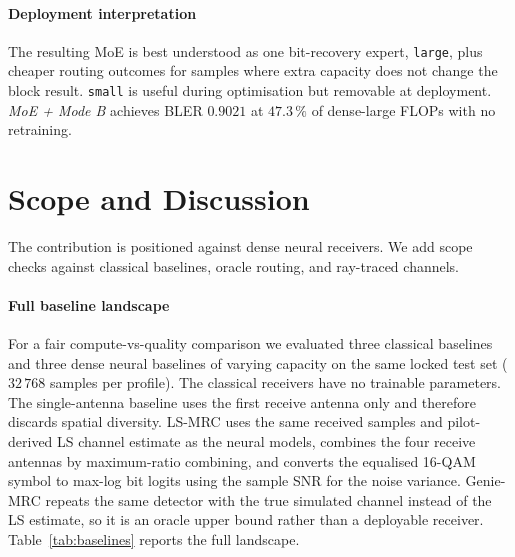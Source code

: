 \paragraph{Deployment interpretation}
The resulting MoE is best understood as one bit-recovery expert, \texttt{large}, plus cheaper routing outcomes for samples where extra capacity does not change the block result. \texttt{small} is useful during optimisation but removable at deployment. \emph{MoE + Mode B} achieves BLER $0.9021$ at $47.3\,\%$ of dense-large FLOPs with no retraining.

\section{Scope and Discussion}
\label{sec:scope}

The contribution is positioned against dense neural receivers. We add scope checks against classical baselines, oracle routing, and ray-traced channels.

\paragraph{Full baseline landscape}
For a fair compute-vs-quality comparison we evaluated three classical baselines and three dense neural baselines of varying capacity on the same locked test set ($32\,768$ samples per profile). The classical receivers have no trainable parameters. The single-antenna baseline uses the first receive antenna only and therefore discards spatial diversity. LS-MRC uses the same received samples and pilot-derived LS channel estimate as the neural models, combines the four receive antennas by maximum-ratio combining, and converts the equalised 16-QAM symbol to max-log bit logits using the sample SNR for the noise variance. Genie-MRC repeats the same detector with the true simulated channel instead of the LS estimate, so it is an oracle upper bound rather than a deployable receiver. Table~\ref{tab:baselines} reports the full landscape.

